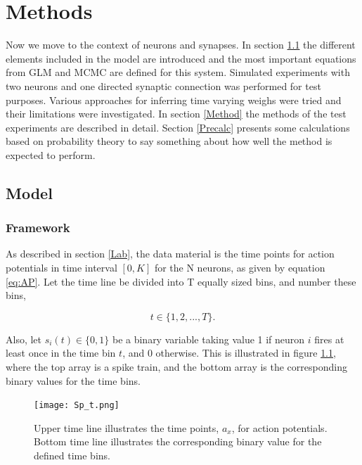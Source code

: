 
\chapter{Methods}

Now we move to the context of neurons and synapses. In section \ref{set_up} the different elements included in the model are introduced and the most important equations from GLM and MCMC are defined for this system. Simulated experiments with two neurons and one directed synaptic connection was performed for test purposes. Various approaches for inferring time varying weighs were tried and their limitations were investigated. In section \ref{Method} the methods of the test experiments are described in detail. Section \ref{Precalc} presents some calculations based on probability theory to say something about how well the method is expected to perform.

\section{Model}
\label{set_up}

\subsection{Framework}
As described in section \ref{Lab}, the data material is the time points for action potentials in time interval $[0,K]$ for the N neurons, as given by equation \ref{eq:AP}. Let the time line be divided into T equally sized bins, and number these bins,

\begin{equation}
    t \in \{1, 2, ..., T\}.
\end{equation}

Also, let $s_{i}(t) \in \{0,1\}$ be a binary variable taking value 1 if neuron $i$ fires at least once in the time bin $t$, and 0 otherwise. This is illustrated in figure \ref{fig:spike_train}, where the top array is a spike train, and the bottom array is the corresponding binary values for the time bins.

\begin{figure}[h]
\caption{Upper time line illustrates the time points, $a_x$, for action potentials. Bottom time line illustrates the corresponding binary value for the defined time bins.}
\label{fig:spike_train}
    \centering
    \texttt{[image: Sp\_t.png]}
\end{figure} 

